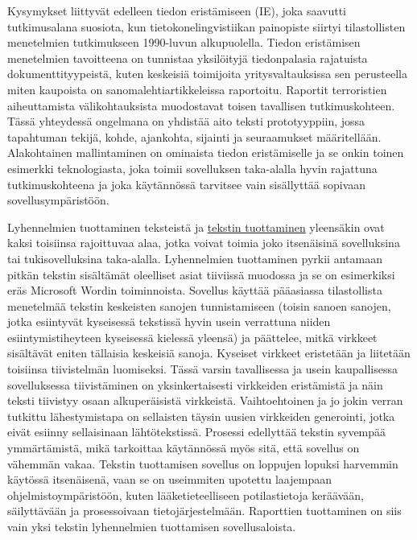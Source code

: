 \documentclass[]{../../metanetpaper}
\begin{document}
\begin{Parallel}[c]{70mm}{70mm}
{Kysymykset liittyvät edelleen tiedon eristämiseen (IE), joka saavutti
tutkimusalana suosiota, kun tietokonelingvistiikan painopiste siirtyi
tilastollisten menetelmien tutkimukseen 1990-luvun
alkupuolella. Tiedon eristämisen menetelmien tavoitteena on tunnistaa
yksilöityjä tiedonpalasia rajatuista dokumenttityypeistä, kuten
keskeisiä toimijoita yritysvaltauksissa sen perusteella miten
kaupoista on sanomalehtiartikkeleissa raportoitu.  Raportit
terroristien aiheuttamista välikohtauksista muodostavat toisen
tavallisen tutkimuskohteen. Tässä yhteydessä ongelmana on yhdistää
aito teksti prototyyppiin, jossa tapahtuman tekijä, kohde, ajankohta,
sijainti ja seuraamukset määritellään. Alakohtainen mallintaminen on
ominaista tiedon eristämiselle ja se onkin toinen esimerkki
teknologiasta, joka toimii sovelluksen taka-alalla hyvin rajattuna
tutkimuskohteena ja joka käytännössä tarvitsee vain sisällyttää
sopivaan sovellusympäristöön.


Lyhennelmien tuottaminen teksteistä ja \underline{tekstin tuottaminen}
yleensäkin ovat kaksi toisiinsa rajoittuvaa alaa, jotka voivat toimia joko
itsenäisinä sovelluksina tai tukisovelluksina
taka-alalla. Lyhennelmien tuottaminen pyrkii antamaan pitkän tekstin
sisältämät oleelliset asiat tiiviissä muodossa ja se on esimerkiksi
eräs Microsoft Wordin toiminnoista. Sovellus käyttää pääasiassa
tilastollista menetelmää tekstin keskeisten sanojen tunnistamiseen
(toisin sanoen sanojen, jotka esiintyvät kyseisessä tekstissä hyvin
usein verrattuna niiden esiintymistiheyteen kyseisessä kielessä
yleensä) ja päättelee, mitkä virkkeet sisältävät eniten tällaisia
keskeisiä sanoja. Kyseiset virkkeet eristetään ja liitetään toisiinsa
tiivistelmän luomiseksi. Tässä varsin tavallisessa ja usein
kaupallisessa sovelluksessa tiivistäminen on yksinkertaisesti
virkkeiden eristämistä ja näin teksti tiivistyy osaan alkuperäisistä
virkkeistä. Vaihtoehtoinen ja jo jokin verran tutkittu lähestymistapa
on sellaisten täysin uusien virkkeiden generointi, jotka eivät esiinny
sellaisinaan lähtötekstissä. Prosessi edellyttää tekstin syvempää
ymmärtämistä, mikä tarkoittaa käytännössä myös sitä, että sovellus on
vähemmän vakaa. Tekstin tuottamisen sovellus on loppujen lopuksi
harvemmin käytössä itsenäisenä, vaan se on useimmiten upotettu
laajempaan ohjelmistoympäristöön, kuten lääketieteelliseen
potilastietoja keräävään, säilyttävään ja prosessoivaan
tietojärjestelmään. Raporttien tuottaminen on siis vain yksi tekstin
lyhennelmien tuottamisen sovellusaloista.

}
\end{Parallel}
\end{document}
